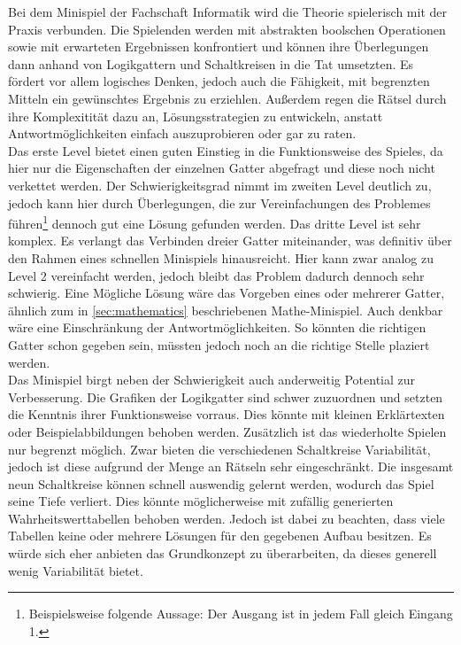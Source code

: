 Bei dem Minispiel der Fachschaft Informatik wird die Theorie spielerisch mit der Praxis verbunden.
Die Spielenden werden mit abstrakten boolschen Operationen sowie mit erwarteten Ergebnissen konfrontiert und können ihre Überlegungen dann anhand von Logikgattern und Schaltkreisen in die Tat umsetzten.
Es fördert vor allem logisches Denken, jedoch auch die Fähigkeit, mit begrenzten Mitteln ein gewünschtes Ergebnis zu erziehlen.
Außerdem regen die Rätsel durch ihre Komplexitität dazu an, Lösungsstrategien zu entwickeln, anstatt Antwortmöglichkeiten einfach auszuprobieren oder gar zu raten.\\
Das erste Level bietet einen guten Einstieg in die Funktionsweise des Spieles, da hier nur die Eigenschaften der einzelnen Gatter abgefragt und diese noch nicht verkettet werden.
Der Schwierigkeitsgrad nimmt im zweiten Level deutlich zu, jedoch kann hier durch Überlegungen, die zur Vereinfachungen des Problemes führen\footnote{Beispielsweise folgende Aussage: \glqq Der Ausgang ist in jedem Fall gleich Eingang 1.\grqq} dennoch gut eine Lösung gefunden werden.
Das dritte Level ist sehr komplex.
Es verlangt das Verbinden dreier Gatter miteinander, was definitiv über den Rahmen eines schnellen Minispiels hinausreicht.
Hier kann zwar analog zu Level 2 vereinfacht werden, jedoch bleibt das Problem dadurch dennoch sehr schwierig.
Eine Mögliche Lösung wäre das Vorgeben eines oder mehrerer Gatter, ähnlich zum in \ref{sec:mathematics} beschriebenen Mathe-Minispiel.
Auch denkbar wäre eine Einschränkung der Antwortmöglichkeiten.
So könnten die richtigen Gatter schon gegeben sein, müssten jedoch noch an die richtige Stelle plaziert werden.\\
Das Minispiel birgt neben der Schwierigkeit auch anderweitig Potential zur Verbesserung.
Die Grafiken der Logikgatter sind schwer zuzuordnen und setzten die Kenntnis ihrer Funktionsweise vorraus.
Dies könnte mit kleinen Erklärtexten oder Beispielabbildungen behoben werden.
Zusätzlich ist das wiederholte Spielen nur begrenzt möglich.
Zwar bieten die verschiedenen Schaltkreise Variabilität, jedoch ist diese aufgrund der Menge an Rätseln sehr eingeschränkt.
Die insgesamt neun Schaltkreise können schnell auswendig gelernt werden, wodurch das Spiel seine Tiefe verliert.
Dies könnte möglicherweise mit zufällig generierten Wahrheitswerttabellen behoben werden.
Jedoch ist dabei zu beachten, dass viele Tabellen keine oder mehrere Lösungen für den gegebenen Aufbau besitzen.
Es würde sich eher anbieten das Grundkonzept zu überarbeiten, da dieses generell wenig Variabilität bietet.

